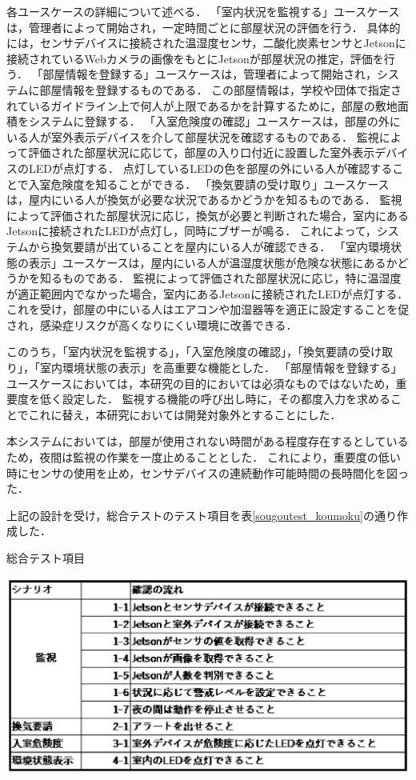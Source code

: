 各ユースケースの詳細について述べる．
「室内状況を監視する」ユースケースは，管理者によって開始され，一定時間ごとに部屋状況の評価を行う．
具体的には，センサデバイスに接続された温湿度センサ，二酸化炭素センサとJetsonに接続されているWebカメラの画像をもとにJetsonが部屋状況の推定，評価を行う．
「部屋情報を登録する」ユースケースは，管理者によって開始され，システムに部屋情報を登録するものである．
この部屋情報は，学校や団体で指定されているガイドライン上で何人が上限であるかを計算するために，部屋の敷地面積をシステムに登録する．
「入室危険度の確認」ユースケースは，部屋の外にいる人が室外表示デバイスを介して部屋状況を確認するものである．
監視によって評価された部屋状況に応じて，部屋の入り口付近に設置した室外表示デバイスのLEDが点灯する．
点灯しているLEDの色を部屋の外にいる人が確認することで入室危険度を知ることができる．
「換気要請の受け取り」ユースケースは，屋内にいる人が換気が必要な状況であるかどうかを知るものである．
監視によって評価された部屋状況に応じ，換気が必要と判断された場合，室内にあるJetsonに接続されたLEDが点灯し，同時にブザーが鳴る．
これによって，システムから換気要請が出ていることを屋内にいる人が確認できる．
「室内環境状態の表示」ユースケースは，屋内にいる人が温湿度状態が危険な状態にあるかどうかを知るものである．
監視によって評価された部屋状況に応じ，特に温湿度が適正範囲内でなかった場合，室内にあるJetsonに接続されたLEDが点灯する．
これを受け，部屋の中にいる人はエアコンや加湿器等を適正に設定することを促され，感染症リスクが高くなりにくい環境に改善できる．

このうち，「室内状況を監視する」，「入室危険度の確認」，「換気要請の受け取り」，「室内環境状態の表示」を高重要な機能とした．
「部屋情報を登録する」ユースケースにおいては，本研究の目的においては必須なものではないため，重要度を低く設定した．
監視する機能の呼び出し時に，その都度入力を求めることでこれに替え，本研究においては開発対象外とすることにした．

本システムにおいては，部屋が使用されない時間がある程度存在するとしているため，夜間は監視の作業を一度止めることとした．
これにより，重要度の低い時にセンサの使用を止め，センサデバイスの連続動作可能時間の長時間化を図った．

上記の設計を受け，総合テストのテスト項目を表\ref{sougoutest_koumoku}の通り作成した．
\begin{table}[htbp]
    \centering
    \caption{総合テスト項目}
    \label{sougoutest_koumoku}
    \includegraphics[width = 15cm]{./picture/sougoutest_koumoku.eps}
\end{table}

